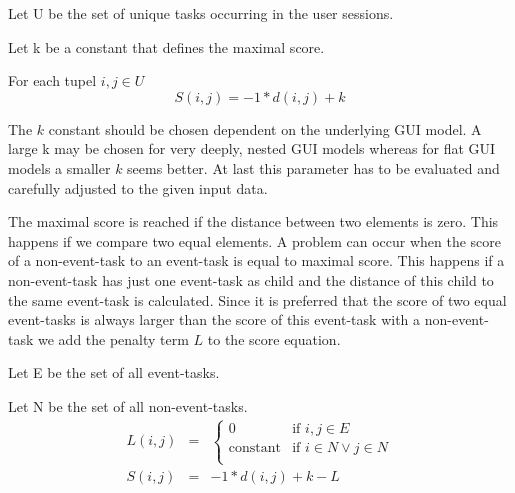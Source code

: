 \begin{definition}
	\item Let U be the set of unique tasks occurring in the user sessions.
	\item Let k be a constant that defines the maximal score.
	\item For each tupel $i,j \in U$
\begin{equation*}
		 S(i,j) = -1*d(i,j)+k
	\label{eq:subscore}
\end{equation*}
\label{def:scorewithmaximalscore}
\end{definition}
The $k$ constant should be chosen dependent on the underlying GUI model.
A large k may be chosen for very deeply, nested GUI models whereas for flat GUI models a smaller $k$ seems better.
At last this parameter has to be evaluated and carefully adjusted to the given input data.

The maximal score is reached if the distance between two elements is zero. This happens if we compare two equal elements.
A problem can occur when the score of a non-event-task to an event-task is equal to maximal score.
This happens if a non-event-task has just one event-task as child and the distance of this child to the same event-task is calculated.
Since it is preferred that the score of two equal event-tasks is always larger than the score of this event-task with a non-event-task we add the penalty term $L$ to the score equation.

\begin{definition}
	\item Let E be the set of all event-tasks.
	\item Let N be the set of all non-event-tasks.
\begin{eqnarray*}
	L(i,j) &=&
	\begin{cases}
		0 & \text{if } i,j \in E \\
		\text{constant} & \text{if } i \in N \lor  j \in N\\
	\end{cases} \\
	S(i,j) &=& -1*d(i,j)+k-L
	\label{eq:subscore_adjusted}
\end{eqnarray*}
\label{def:scoreadjusted}
\end{definition}


